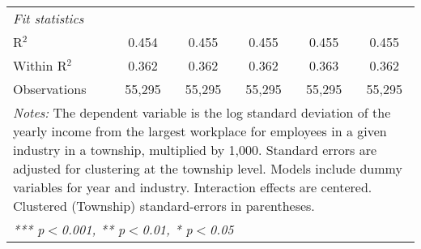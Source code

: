 \begin{tabular}{lccccc}
   \midrule
   \emph{Fit statistics}\\
   R$^2$                                     & 0.454            & 0.455            & 0.455            & 0.455            & 0.455\\  
   Within R$^2$                              & 0.362            & 0.362            & 0.362            & 0.363            & 0.362\\  
   Observations                              & 55,295           & 55,295           & 55,295           & 55,295           & 55,295\\  
   \midrule \midrule
\multicolumn{6}{p{16cm}}{\emph{Notes:} The dependent variable is the log 
    standard deviation of the yearly income from the largest workplace for 
    employees in a given industry in a township, multiplied by 1,000. Standard 
    errors are adjusted for clustering at the township level. Models include 
    dummy variables for year and industry. Interaction effects are centered. 
    Clustered (Township) standard-errors in parentheses.}\\
\multicolumn{6}{l}{\emph{*** p$<$0.001, ** p$<$0.01, * p$<$0.05}} \\ 
\end{tabular}
\par\endgroup
